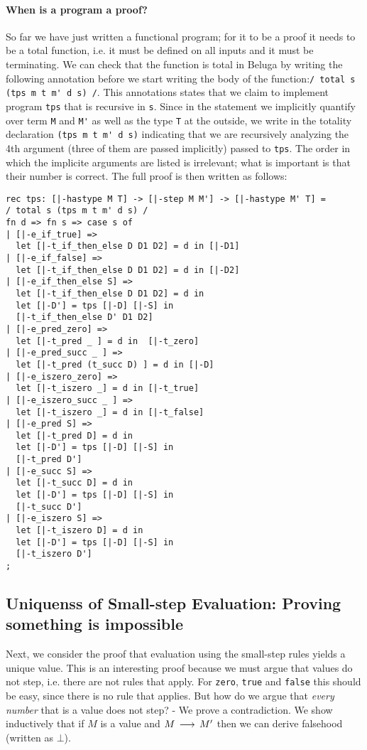 \paragraph{When is a program a proof?} So far we have just written a
functional program; for it to be a proof it needs to be a total
function, i.e. it must be defined on all inputs and it must be
terminating. We can check that the function is total in Beluga by
writing the following annotation before we start writing the body of
the function:\lstinline!/ total s (tps m t m' d s) /!. This
annotations states that we claim to implement program \lstinline!tps! that is
recursive in \lstinline!s!. Since in the statement we implicitly
quantify over term \lstinline!M! and \lstinline!M'! as well as the
type \lstinline!T! at the outside, we write in the totality
declaration \lstinline!(tps m t m' d s)! indicating that we are
recursively analyzing the 4th argument (three of them are passed
implicitly) passed to \lstinline!tps!. The order in which the
implicite arguments are listed is irrelevant; what is important is
that their number is correct.
The full proof is then written as follows:


\begin{lstlisting}
rec tps: [|-hastype M T] -> [|-step M M'] -> [|-hastype M' T] =
/ total s (tps m t m' d s) /
fn d => fn s => case s of
| [|-e_if_true] =>
  let [|-t_if_then_else D D1 D2] = d in [|-D1]
| [|-e_if_false] =>
  let [|-t_if_then_else D D1 D2] = d in [|-D2]
| [|-e_if_then_else S] =>
  let [|-t_if_then_else D D1 D2] = d in
  let [|-D'] = tps [|-D] [|-S] in
  [|-t_if_then_else D' D1 D2]
| [|-e_pred_zero] =>
  let [|-t_pred _ ] = d in  [|-t_zero]
| [|-e_pred_succ _ ] =>
  let [|-t_pred (t_succ D) ] = d in [|-D]
| [|-e_iszero_zero] =>
  let [|-t_iszero _] = d in [|-t_true]
| [|-e_iszero_succ _ ] =>
  let [|-t_iszero _] = d in [|-t_false]
| [|-e_pred S] =>
  let [|-t_pred D] = d in
  let [|-D'] = tps [|-D] [|-S] in
  [|-t_pred D']
| [|-e_succ S] =>
  let [|-t_succ D] = d in
  let [|-D'] = tps [|-D] [|-S] in
  [|-t_succ D']
| [|-e_iszero S] =>
  let [|-t_iszero D] = d in
  let [|-D'] = tps [|-D] [|-S] in
  [|-t_iszero D']
;
\end{lstlisting}


\subsection{Uniquenss of Small-step Evaluation: Proving something is impossible}
Next, we consider the proof that evaluation using the small-step rules yields a
unique value. This is an interesting proof because we must argue that values do
not step, i.e. there are not rules that apply. For \lstinline!zero!,
\lstinline!true! and \lstinline!false! this should be easy, since there is no
rule that applies. But how do we argue that \emph{every number} that is a value
does not step? - We prove a contradiction. We show inductively that if $M$ is a
value and $M \mathrel{\,\longrightarrow\,} M'$ then we can derive falsehood (written as $\bot$).

